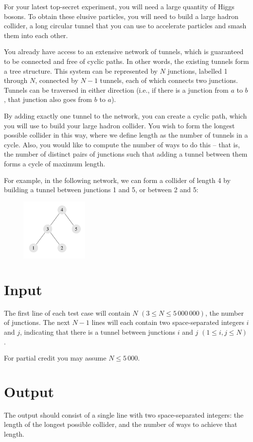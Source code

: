 For your latest top-secret experiment, you will need a large quantity of Higgs bosons. To obtain
these elusive particles, you will need to build a large hadron collider, a long circular tunnel that
you can use to accelerate particles and smash them into each other.

You already have access to an extensive network of tunnels, which is guaranteed to be connected
and free of cyclic paths. In other words, the existing tunnels form a tree structure. This system can
be represented by $N$ junctions, labelled 1 through $N$, connected by $N - 1$ tunnels, each of which
connects two junctions. Tunnels can be traversed in either direction (i.e., if there is a junction from
$a$ to $b$, that junction also goes from $b$ to $a$).

By adding exactly one tunnel to the network, you can create a cyclic path, which you will use to
build your large hadron collider. You wish to form the longest possible collider in this way, where
we define length as the number of tunnels in a cycle. Also, you would like to compute the number of
ways to do this -- that is, the number of distinct pairs of junctions such that adding a tunnel
between them forms a cycle of maximum length.

For example, in the following network, we can form a collider of length 4 by building a tunnel
between junctions 1 and 5, or between 2 and 5:
\begin{figure}[h]
    \begin{center}
    \includegraphics[width=0.3\textwidth]{lhc}
    \end{center}
\end{figure}

\section*{Input}
The first line of each test case will contain $N$ $(3 \le N \le 5\,000\,000)$, the number of junctions.
The next $N - 1$ lines will each contain two space-separated integers $i$ and $j$, indicating that
there is a tunnel between junctions $i$ and $j$ $(1 \le i, j \le N)$.

For partial credit you may assume $N \le 5\,000$.

\section*{Output}
The output should consist of a single line with two space-separated integers: the length of the
longest possible collider, and the number of ways to achieve that length.

